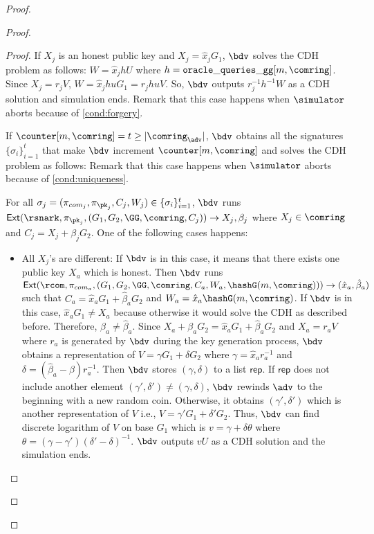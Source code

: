 \begin{proof}
\begin{proof}
\begin{proof}
			If $ X_j  $ is an honest public key and $ X_j = \hat{x}_jG_1 $, $ \bdv $ solves the CDH problem as follows: $ W = \hat{x}_j h U $ where $ h = \mathtt{oracle\_queries\_gg}[m, \comring] $. Since $ X_j = r_j V $, $ W = \hat{x}_jhuG_1 =r_jhuV $. So, $ \bdv $ outputs $ r_j^{-1}h^{-1}W $ as a CDH solution and simulation ends. Remark that this case happens when $ \simulator $ aborts because of \ref{cond:forgery}.
			
			If $  \counter[m,\comring] = t \geq |\comring_\adv| $, $ \bdv $ obtains all the signatures $ \{\sigma_i\}_{i =1}^t $ that make $ \bdv $ increment $ \counter[m,\comring] $ and solves the CDH problem as follows: Remark that this case happens when $ \simulator $ aborts because of \ref{cond:uniqueness}.
			
			For all $ \sigma_j = (\pi_{com_j},\pi_{\pk_j},C_j,W_j) \in \{\sigma_i\}_{i =1}^t $, $ \bdv $ runs $ \mathsf{Ext}(\rsnark,\pi_{\pk_j},(G_1,G_2, \GG,\comring, C_j) ) \rightarrow X_j, \beta_j$ where $ X_j\in \comring $ and $ C_j = X_j + \beta_j G_2 $. One of the following cases happens:
			
			\begin{itemize}
				\item All $ X_j$'s are different: If $ \bdv $ is in this case, it means that there exists one public key $ X_a $ which is honest. Then $ \bdv $ runs $ \mathsf{Ext}(\rcom,\pi_{com_a},(G_1,G_2, \GG,\comring, C_a,W_a,\hashG(m,\comring))) \rightarrow (\hat{x}_a,\hat{\beta}_a )$ such that $ C_a = \hat{x}_aG_1 + \hat{\beta}_a G_2 $ and $ W_a = \hat{x}_a \hashG(m,\comring) $.  If $ \bdv $ is in this case, $ \hat{x}_aG_1\neq X_a $ because otherwise it would solve the CDH as described before. Therefore, $ \beta_a \neq \hat{\beta}_a $. Since $ X_a + \beta_a G_2 = \hat{x}_aG_1 + \hat{\beta}_a G_2  $ and $ X_a = r_aV $ where $ r_a $ is generated by $ \bdv $ during the key generation process, $ \bdv $ obtains a representation of $ V = \gamma G_1 + \delta G_2 $ where $ \gamma = \hat{x}_ar^{-1}_a  $ and $ \delta = (\hat{\beta}_a -\beta)r_a^{-1} $. Then $ \bdv $ stores $ (\gamma, \delta) $ to a list $ \mathsf{rep} $. If $ \mathsf{rep} $ does not include another element $ (\gamma', \delta')  \neq (\gamma, \delta) $, $ \bdv $ rewinds $ \adv $ to the beginning with a new random coin.  Otherwise, it obtains $ (\gamma', \delta') $ which is another representation of $ V $ i.e., $ V = \gamma' G_1 + \delta' G_2 $. Thus, $ \bdv $ can find discrete logarithm of $ V $ on base $ G_1 $ which is $ v = \gamma + \delta \theta $ where $ \theta = (\gamma - \gamma')(\delta' - \delta)^{-1} $. $ \bdv $ outputs $ vU $ as a CDH solution and the simulation ends.
				

\end{itemize}
\end{proof}
\end{proof}
\end{proof}
